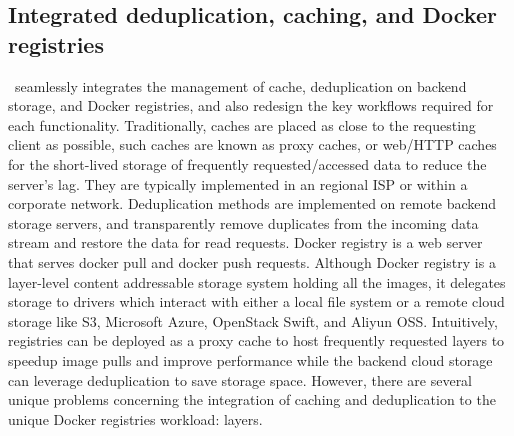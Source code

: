 \subsection{Integrated deduplication, caching, and Docker registries}
\label{sec:design}

%

%
%
%

\sysname~seamlessly integrates the management of cache, deduplication on backend storage, and Docker registries,
and also redesign the key workflows required for each functionality. 
Traditionally, caches are placed as close to the requesting client as possible, such caches are known as proxy caches, or web/HTTP caches for the short-lived storage of 
frequently requested/accessed data to reduce the server's lag. 
They are typically implemented in an regional ISP or within a corporate network.
Deduplication methods are implemented on remote backend storage servers, and
transparently remove duplicates from the incoming data stream and restore the data for read requests. 
Docker registry is a web server that serves docker pull and docker push requests.
Although Docker registry is a layer-level content addressable storage system holding all the images,
it delegates storage to drivers which interact with either a local file system or a remote cloud storage like S3, Microsoft Azure, OpenStack Swift, and Aliyun OSS.
Intuitively, registries can be deployed as a proxy cache to host frequently requested layers to speedup image pulls and improve performance 
while the backend cloud storage can leverage deduplication to save storage space.
However, there are several unique problems concerning the integration of caching and deduplication to the unique Docker registries workload: layers. 


